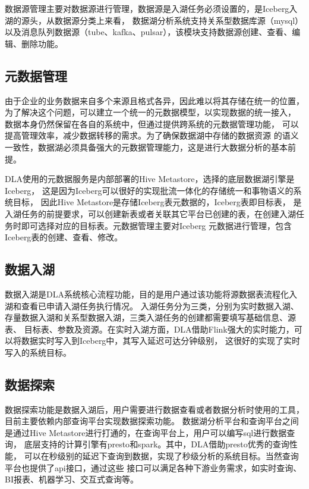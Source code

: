 数据源管理主要对数据源进行管理，数据源是入湖任务必须设置的，是Iceberg入湖的源头，从数据源分类上来看，
数据湖分析系统支持关系型数据库源（mysql）以及消息队列数据源（tube、kafka\cite{31,40}、pulsar\cite{17}），该模块支持数据源创建、查看、编辑、删除功能。

\subsection{元数据管理}

由于企业的业务数据来自多个来源且格式各异，因此难以将其存储在统一的位置，
为了解决这个问题，可以建立一个统一的元数据模型，以实现数据的统一接入\cite{18,19}，
数据本身仍然保留在各自的系统中，但通过提供跨系统的元数据管理功能，
可以提高管理效率，减少数据转移的需求。为了确保数据湖中存储的数据资源
的语义一致性，数据湖必须具备强大的元数据管理能力，这是进行大数据分析的基本前提\cite{20}。

DLA使用的元数据服务是内部部署的Hive Metastore，选择的底层数据湖引擎是Iceberg，
这是因为Iceberg可以很好的实现批流一体化的存储统一和事物语义的系统目标，
因此Hive Metastore是存储Iceberg表元数据的，Iceberg表即目标表，
是入湖任务的前提要求，可以创建新表或者关联其它平台已创建的表，在创建入湖任务时即可选择对应的目标表。元数据管理主要对Iceberg
元数据进行管理，包含Iceberg表的创建、查看、修改。

\subsection{数据入湖}

数据入湖是DLA系统核心流程功能，目的是用户通过该功能将源数据表流程化入湖和查看已申请入湖任务执行情况。
入湖任务分为三类，分别为实时数据入湖、存量数据入湖和关系型数据入湖，三类入湖任务的创建都需要填写基础信息、源表、
目标表、参数及资源。在实时入湖方面，DLA借助Flink强大的实时能力，可以将数据实时写入到Iceberg中，其写入延迟可达分钟级别，
这很好的实现了实时写入的系统目标。

\subsection{数据探索}

数据探索功能是数据入湖后，用户需要进行数据查看或者数据分析时使用的工具，目前主要依赖内部查询平台实现数据探索功能。
数据湖分析平台和查询平台之间是通过Hive Metastore\cite{30}进行打通的，在查询平台上，用户可以编写sql进行数据查询，
底层支持的计算引擎有presto\cite{16}和spark\cite{23}。其中，DLA借助presto优秀的查询性能，
可以在秒级别的延迟下查询到数据，实现了秒级分析的系统目标。当然查询平台也提供了api接口，通过这些
接口可以满足各种下游业务需求，如实时查询、BI报表、机器学习、交互式查询等。

